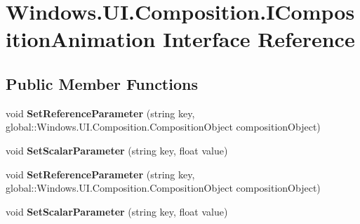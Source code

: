 \hypertarget{interface_windows_1_1_u_i_1_1_composition_1_1_i_composition_animation}{}\section{Windows.\+U\+I.\+Composition.\+I\+Composition\+Animation Interface Reference}
\label{interface_windows_1_1_u_i_1_1_composition_1_1_i_composition_animation}
\subsection*{Public Member Functions}
\begin{DoxyCompactItemize}
\item 
\mbox{\label{interface_windows_1_1_u_i_1_1_composition_1_1_i_composition_animation_abecd5f2353d175d7382cc8388772d2e5}} 
void {\bfseries Set\+Reference\+Parameter} (string key, global\+::\+Windows.\+U\+I.\+Composition.\+Composition\+Object composition\+Object)
\item 
\mbox{\label{interface_windows_1_1_u_i_1_1_composition_1_1_i_composition_animation_af6355b211c24294fc2a8271392630abb}} 
void {\bfseries Set\+Scalar\+Parameter} (string key, float value)
\item 
\mbox{\label{interface_windows_1_1_u_i_1_1_composition_1_1_i_composition_animation_abecd5f2353d175d7382cc8388772d2e5}} 
void {\bfseries Set\+Reference\+Parameter} (string key, global\+::\+Windows.\+U\+I.\+Composition.\+Composition\+Object composition\+Object)
\item 
\mbox{\label{interface_windows_1_1_u_i_1_1_composition_1_1_i_composition_animation_af6355b211c24294fc2a8271392630abb}} 
void {\bfseries Set\+Scalar\+Parameter} (string key, float value)
\item 
\mbox{\label{interface_windows_1_1_u_i_1_1_composition_1_1_i_composition_animation_abecd5f2353d175d7382cc8388772d2e5}} 

\end{DoxyCompactItemize}
